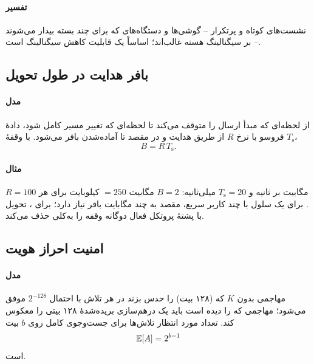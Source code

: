 \documentclass[11pt,a4paper]{article}
\begin{document}
\paragraph{تفسیر} نشست‌های کوتاه و پرتکرار -- گوشی‌ها و دستگاه‌های  که برای چند بسته بیدار می‌شوند -- بر سیگنالینگ هسته
غالب‌اند؛  اساساً یک قابلیت کاهش سیگنالینگ است.

\begin{acnfigure}
  \caption{بار پیام  به تفکیک نوع رویه برای مدل تصویری \cref{sec:load}.}
  \label{fig:load}
\end{acnfigure}

\subsection{بافر هدایت در طول تحویل}\label{sec:fwd}
\paragraph{مدل} از لحظه‌ای که مبدأ ارسال را متوقف می‌کند تا لحظه‌ای که تغییر مسیر کامل شود، دادهٔ فروسو با نرخ $R$ از طریق 
هدایت و در مقصد تا آماده‌شدن  بافر می‌شود. با وقفهٔ $T_{\mathrm{s}}$،
\begin{equation}\label{eq:fwd}
  B = R\,T_{\mathrm{s}} .
\end{equation}
\paragraph{مثال} $R = 100$ مگابیت بر ثانیه و $T_{\mathrm{s}} = 20$ میلی‌ثانیه: $B = 2$ مگابیت $= 250$ کیلوبایت برای هر . برای یک
سلول  با چند کاربر سریع، مقصد به چند مگابایت بافر نیاز دارد؛ برای ، تحویل با پشتهٔ پروتکل فعال دوگانه وقفه را
به‌کلی حذف می‌کند.

\subsection{امنیت احراز هویت}\label{sec:sec}
\paragraph{مدل} مهاجمی بدون $K$ که  (۱۲۸ بیت) را حدس بزند در هر تلاش با احتمال $2^{-128}$ موفق می‌شود؛ مهاجمی که 
را دیده است باید یک درهم‌سازی بریده‌شدهٔ ۱۲۸ بیتی را معکوس کند. تعداد مورد انتظار تلاش‌ها برای جست‌وجوی کامل روی $b$ بیت
\begin{equation}\label{eq:brute}
  \mathbb{E}[A] = 2^{b-1}
\end{equation}
است.
\end{document}
